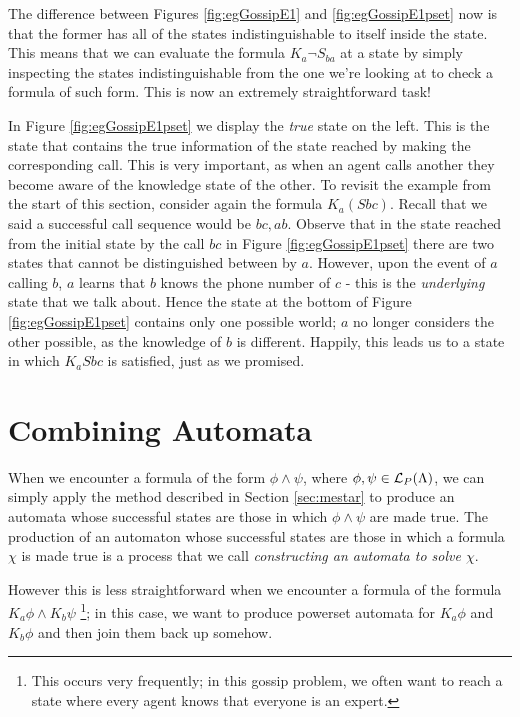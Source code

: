 \documentclass[10pt, a4paper]{report}
\begin{document}
The difference between Figures \ref{fig:egGossipE1} and \ref{fig:egGossipE1pset}
now is that the former has all of the states indistinguishable to itself inside
the state. This means that we can evaluate the formula $K_a \neg S_{ba}$ at a
state by simply inspecting the states indistinguishable from the one we're
looking at to check a formula of such form. This is now an extremely
straightforward task! 

In Figure \ref{fig:egGossipE1pset} we display the \emph{true} state on the left.
This is the state that contains the true information of the state reached by
making the corresponding call. This is very important, as when an agent calls
another they become aware of the knowledge state of the other. To revisit the
example from the start of this section, consider again the formula $K_a (Sbc)$.
Recall that we said a successful call sequence would be $bc, ab$. Observe that
in the state reached from the initial state by the call $bc$ in Figure
\ref{fig:egGossipE1pset} there are two states that cannot be distinguished
between by $a$. However, upon the event of $a$ calling $b$, $a$ learns that $b$
knows the phone number of $c$ - this is the \emph{underlying} state that we talk
about. Hence the state at the bottom of Figure \ref{fig:egGossipE1pset} contains
only one possible world; $a$ no longer considers the other possible, as the
knowledge of $b$ is different. Happily, this leads us to a state in which $K_a
Sbc$ is satisfied, just as we promised. 

\section{Combining Automata}

When we encounter a formula of the form $\phi \land \psi$, where $\phi, \psi \in
\mathcal{L}_P(\Lambda)$, we can simply apply the method described in Section
\ref{sec:mestar} to produce an automata whose successful states are those in
which $\phi \land \psi$ are made true. The production of an automaton whose
successful states are those in which a formula $\chi$ is made true is a process
that we call \emph{constructing an automata to solve $\chi$}.

However this is less straightforward when we encounter a formula of the formula
$K_a \phi \land K_b \psi$ \footnote{This occurs very frequently; in this gossip
  problem, we often want to reach a state where every agent knows that everyone
  is an expert.}; in this case, we want to produce powerset automata for $K_a
\phi$ and $K_b \phi$ and then join them back up somehow.
\end{document}
